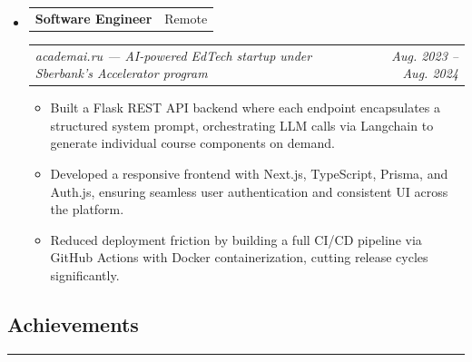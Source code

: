 \documentclass[11pt,letterpaper]{article}
\makeatletter
\newcommand{\headerrow}[2]
{\begin{tabular*}{\linewidth}{l@{\extracolsep{\fill}}r}
#1 & #2 \\
\end{tabular*}}
\makeatother
\begin{document}
\begin{itemize}[leftmargin=0em, itemsep=0.6em]
    \item
    \headerrow
        {\textbf{Software Engineer}}
        {Remote}
    \headerrow
        {\emph{academai.ru --- AI-powered EdTech startup under Sberbank's Accelerator program}}
        {\emph{Aug. 2023 -- Aug. 2024}}
    \begin{itemize}[leftmargin=1.2em, itemsep=0.1em]
        \renewcommand\labelitemi{$\bullet$}
        \item Built a Flask REST API backend where each endpoint encapsulates a structured system prompt, 
        orchestrating LLM calls via Langchain to generate individual course components on demand.
        \item Developed a responsive frontend with Next.js, TypeScript, Prisma, and Auth.js,
              ensuring seamless user authentication and consistent UI across the platform.
        \item Reduced deployment friction by building a full CI/CD pipeline via GitHub Actions
              with Docker containerization, cutting release cycles significantly.
    \end{itemize}

\end{itemize}

\vspace{0.2cm}

\subsection*{\Large Achievements}
\vspace{-0.5em}
\hrule
\vspace{0.3em}
\end{document}

